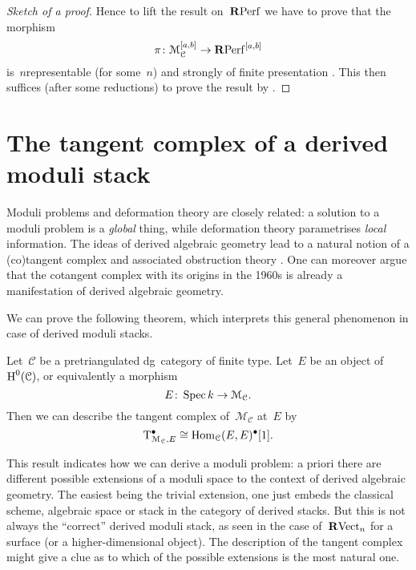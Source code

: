 \begin{refsection}
\begin{theorem}
\begin{proof}[Sketch of a proof]
    Hence to lift the result on~$\mathbf{R}\mathrm{Perf}$ we have to prove that the morphism
    \begin{equation}
      \pi\colon\mathcal{M}_{\mathcal{C}}^{[a,b]}\to\mathbf{R}\mathrm{Perf}^{[a,b]}
    \end{equation}
    is~$n$\dash representable (for some~$n$) and strongly of finite presentation \cite[lemma 2.20]{toen-vaquie}. This then suffices (after some reductions) to prove the result by \cite[lemma 2.15]{toen-vaquie}.
  \end{proof}
\end{theorem}


\section{The tangent complex of a derived moduli stack}
Moduli problems and deformation theory are closely related: a solution to a moduli problem is a \emph{global} thing, while deformation theory parametrises \emph{local} information. The ideas of derived algebraic geometry lead to a natural notion of a (co)tangent complex and associated obstruction theory \cite[section 2.2]{hagII}. One can moreover argue that the cotangent complex with its origins in the 1960s is already a manifestation of derived algebraic geometry.

We can prove the following theorem, which interprets this general phenomenon \cite[section 1.4]{hagII} in case of derived moduli stacks.
\begin{theorem}
  Let~$\mathcal{C}$ be a pretriangulated dg~category of finite type. Let~$E$ be an object of~$\operatorname{H}^0(\mathcal{C})$, or equivalently a morphism
  \begin{equation}
    E\colon\operatorname{Spec} k\to\mathcal{M}_{\mathcal{C}}.
  \end{equation}
  Then we can describe the tangent complex of~$\mathcal{M}_{\mathcal{C}}$ at~$E$ by
  \begin{equation}
    \mathrm{T}_{\mathcal{M}_{\mathcal{C}},E}^\bullet\cong\mathrm{Hom}_{\mathcal{C}}(E,E)^\bullet[1].
  \end{equation}
\end{theorem}

\begin{remark}
  This result indicates how we can derive a moduli problem: a priori there are different possible extensions of a moduli space to the context of derived algebraic geometry. The easiest being the trivial extension, one just embeds the classical scheme, algebraic space or stack in the category of derived stacks. But this is not always the ``correct'' derived moduli stack, as seen in the case of~$\mathbf{R}\mathrm{Vect}_n$ for a surface (or a higher-dimensional object). The description of the tangent complex might give a clue as to which of the possible extensions is the most natural one.
\end{remark}



\end{refsection}
